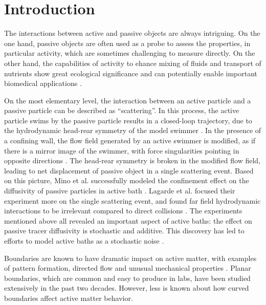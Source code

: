 \documentclass[%
superscriptaddress,
 amsmath,amssymb,
 aps,prl,
]{revtex4-2}
\begin{document}
\maketitle

\section{Introduction}
The interactions between active and passive objects are always intriguing. On the one hand, passive objects are often used as a probe to assess the properties, in particular activity, which are sometimes challenging to measure directly. On the other hand, the capabilities of activity to ehance mixing of fluids and transport of nutrients show great ecological significance and can potentially enable important biomedical applications \cite{Kurtuldu2011, Pushkin2013, Saintillan2008a, Sokolov2009a}.

On the most elementary level, the interaction between an active particle and a passive particle can be described as ``scattering''. In this process, the active particle swims by the passive particle results in a closed-loop trajectory, due to the hydrodynamic head-rear symmetry of the model swimmer \cite{Dunkel2010}. In the presence of a confining wall, the flow field generated by an active swimmer is modified, as if there is a mirror image of the swimmer, with force singularities pointing in opposite directions \cite{Blake1974}. The head-rear symmetry is broken in the modified flow field, leading to net displacement of passive object in a single scattering event. Based on this picture, Mino et al. successfully modeled the confinement effect on the diffusivity of passive particles in active bath \cite{Mino2011, Mino2013}. Lagarde et al. focused their experiment more on the single scattering event, and found far field hydrodynamic interactions to be irrelevant compared to direct collisions \cite{Lagarde2020}. The experiments mentioned above all revealed an important aspect of active baths: the effect on passive tracer diffusivity is stochastic and additive.
This discovery has led to efforts to model active baths as a stochastic noise \cite{Gregoire2001, Maggi2014, Wu2000, Ye2020}.

Boundaries are known to have dramatic impact on active matter, with examples of pattern formation, directed flow and unusual mechanical properties \cite{Wioland2013, Wu2017, Liu2019}. Planar boundaries, which are common and easy to produce in labs, have been studied extensively in the past two decades. However, less is known about how curved boundaries affect active matter behavior.
\end{document}
